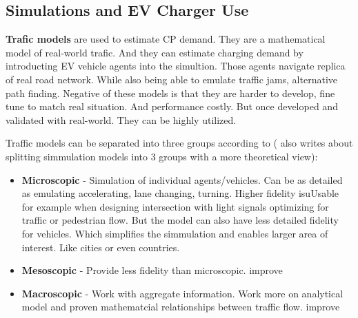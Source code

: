 \subsection{Simulations and EV Charger Use}

\textbf{Trafic models} are used to estimate \acrfull{CP} demand. They are a mathematical model of real-world trafic. And they can estimate charging demand by introducting EV vehicle agents into the simultion. Those agents navigate replica of real road network. While also being able to emulate traffic jams, alternative path finding. Negative of these models is that they are harder to develop, fine tune to match real situation. And performance costly. But once developed and validated with real-world. They can be highly utilized.

\begin{kaobox}[frametitle=\text{Micro,Macro,Meno-Scopic}]

    Traffic models can be separated into three groups according to \cite{TrafficAnalysisTools}\cite{HomeAustroads}(\cite{lachowiczMicroscopicMesoscopicMacroscopic2011} also writes about splitting simmulation models into 3 groups with a more theoretical view):

    \begin{itemize}
        \item \textbf{Microscopic} - Simulation of individual agents/vehicles. Can be as detailed as emulating accelerating, lane changing, turning. Higher fidelity isuUsable for example when designing intersection with light signals optimizing for traffic or pedestrian flow. But the model can also have less detailed fidelity for vehicles. Which simplifies the simmulation and enables larger area of interest. Like cities or even countries.
        \item \textbf{Mesoscopic} - Provide less fidelity than microscopic. improve
        \item \textbf{Macroscopic} - Work with aggregate information. Work more on analytical model and proven mathematcial relationships between traffic flow. improve
    \end{itemize}
\end{kaobox}


